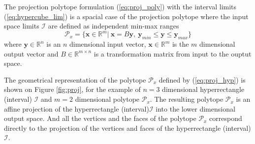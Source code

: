 The projection polytope formulation (\ref{eq:proj_poly}) with the interval limits (\ref{eq:hypercube_lim}) is a spacial case of the projection polytope where the input space limits $\mathcal{I}$ are defined as independent min-max ranges 
\begin{equation}
    \mathcal{P}_x=\{\bm{x} \in \mathbb{R}^m|~ \bm{x} = B\bm{y},~\bm{y}_{min} \leq  \bm{y} \leq \bm{y}_{max}  \}
    \label{eq:proj_hyp}
\end{equation}
where $\bm{y}\in\mathbb{R}^n$ is an $n$ dimensional input vector, $\bm{x}\in\mathbb{R}^m$ is the $m$ dimensional output vector and $B\in\mathbb{R}^{m\times n}$ is a transformation matrix from input to the ouptut space.

The geometrical representation of the polytope $\mathcal{P}_x$ defined by (\ref{eq:proj_hyp}) is shown on Figure \ref{fig:proj}, for the example of $n=3$ dimensional hyperrectangle (interval) $\mathcal{I}$ and $m=2$ dimensional polytope $\mathcal{P}_x$. The resulting polytope $\mathcal{P}_x$ is an affine projection of the hyperrectangle (interval)$\mathcal{I}$ into the lower dimensional output space. And all the vertices and the faces of the polytope $\mathcal{P}_x$ correspond directly to the projection of the vertices and faces of the hyperrectangle (interval) $\mathcal{I}$. 
 
